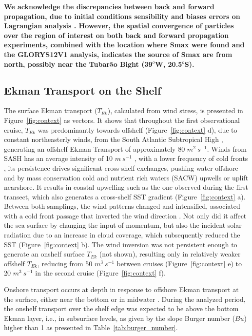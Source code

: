 \documentclass[draft]{agujournal2019}
\begin{document}
\textbf{We acknowledge the discrepancies between back and forward propagation, due to initial conditions sensibility and biases errors on Lagrangian analysis \cite{reijnders2026stability}. However, the spatial convergence of particles over the region of interest on both back and forward propagation experiments, combined with the location where Smax were found and the GLORYS12V1 analysis, indicates the source of Smax are from north, possibly near the Tubarão Bight (39$^o$W, 20.5$^o$S).}

\subsection{Ekman Transport on the Shelf}
\label{sub:ekman}

The surface Ekman transport ($T_{Ek}$), calculated from wind stress, is presented in Figure~\ref{fig:context} as vectors. It shows that throughout the first observational cruise, $T_{Ek}$ was predominantly towards offshelf (Figure~\ref{fig:context} d), due to constant northeasterly winds, from the South Atlantic Subtropical High \cite<SASH, >{stech1990estudo}, generating an offshelf Ekman Transport of approximately 80 $m^2\ s^{-1}$. Winds from SASH has an average intensity of 10 $m\ s^{-1}$ \cite{pimenta2019brazil}, with a lower frequency of cold fronts \cite{stech1990estudo}, its persistence drives significant cross-shelf exchanges, pushing water offshore and by mass conservation cold and nutrient rich waters (SACW) upwells or uplift nearshore. It results in coastal upwelling such as the one observed during the first transect, which also generates a cross-shelf SST gradient (Figure~\ref{fig:context} a). Between both samplings, the wind patterns changed and intensified, associated with a cold front passage that inverted the wind direction \cite{stech1990estudo}. Not only did it affect the sea surface by changing the input of momentum, but also the incident solar radiation due to an increase in cloud coverage, which subsequently reduced the SST (Figure~\ref{fig:context} b). The wind inversion was not persistent enough to generate an onshelf surface $T_{Ek}$ (not shown), resulting only in relatively weaker offshelf $T_{Ek}$, reducing from 50 $m^3\ s^{-1}$ between cruises (Figure~\ref{fig:context} e) to 20 $m^3\ s^{-1}$ in the second cruise (Figure~\ref{fig:context} f).

Onshore transport occurs at depth in response to offshore Ekman transport at the surface, either near the bottom or in midwater \cite{LentzChapman2004}. During the analyzed period, the onshelf transport over the shelf edge was expected to be above the bottom Ekman layer, i.e., in subsurface levels, as given by the slope Burger number ($Bu$) higher than 1 \cite{LentzChapman2004} as presented in Table~\ref{tab:burger_number}.
\end{document}

